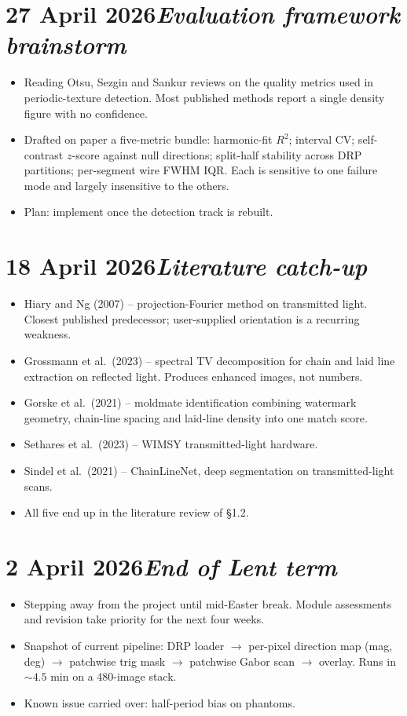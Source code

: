 \documentclass[11pt,a4paper]{article}
\newcommand{\logentry}[2]{\section*{#1\hfill\normalfont\normalsize\textit{#2}}}
\begin{document}
\logentry{27 April 2026}{Evaluation framework brainstorm}
\begin{itemize}
  \item Reading Otsu, Sezgin and Sankur reviews on the quality metrics used in periodic-texture detection. Most published methods report a single density figure with no confidence.
  \item Drafted on paper a five-metric bundle: harmonic-fit $R^2$; interval CV; self-contrast $z$-score against null directions; split-half stability across DRP partitions; per-segment wire FWHM IQR. Each is sensitive to one failure mode and largely insensitive to the others.
  \item Plan: implement once the detection track is rebuilt.
\end{itemize}

\logentry{18 April 2026}{Literature catch-up}
\begin{itemize}
  \item Hiary and Ng (2007) -- projection-Fourier method on transmitted light. Closest published predecessor; user-supplied orientation is a recurring weakness.
  \item Grossmann et al.\ (2023) -- spectral TV decomposition for chain and laid line extraction on reflected light. Produces enhanced images, not numbers.
  \item Gorske et al.\ (2021) -- moldmate identification combining watermark geometry, chain-line spacing and laid-line density into one match score.
  \item Sethares et al.\ (2023) -- WIMSY transmitted-light hardware.
  \item Sindel et al.\ (2021) -- ChainLineNet, deep segmentation on transmitted-light scans.
  \item All five end up in the literature review of \S 1.2.
\end{itemize}

\logentry{2 April 2026}{End of Lent term}
\begin{itemize}
  \item Stepping away from the project until mid-Easter break. Module assessments and revision take priority for the next four weeks.
  \item Snapshot of current pipeline: DRP loader $\to$ per-pixel direction map (mag, deg) $\to$ patchwise trig mask $\to$ patchwise Gabor scan $\to$ overlay. Runs in $\sim 4.5$ min on a 480-image stack.
  \item Known issue carried over: half-period bias on phantoms.
\end{itemize}
\end{document}
